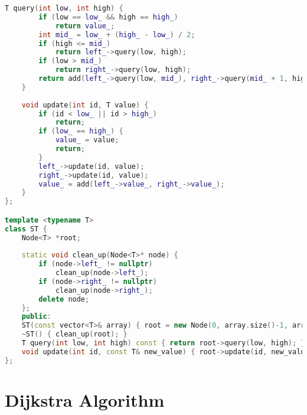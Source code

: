 \begin{itemize}
\begin{lstlisting}[language=C++]
	T query(int low, int high) {
		if (low == low_ && high == high_)
			return value_;
		int mid_ = low_ + (high_ - low_) / 2;
		if (high <= mid_)
			return left_->query(low, high);
		if (low > mid_)
			return right_->query(low, high);    
		return add(left_->query(low, mid_), right_->query(mid_ + 1, high));
	}
	
	void update(int id, T value) {
		if (id < low_ || id > high_)
			return;
		if (low_ == high_) {
			value_ = value;
			return;
		}
		left_->update(id, value);
		right_->update(id, value);
		value_ = add(left_->value_, right_->value_);
	}
};

template <typename T>
class ST {
	Node<T> *root;
	
	static void clean_up(Node<T>* node) {
		if (node->left_ != nullptr)
			clean_up(node->left_);
		if (node->right_ != nullptr)
			clean_up(node->right_);
		delete node;
	};
	public:
	ST(const vector<T>& array) { root = new Node(0, array.size()-1, array); }
	~ST() { clean_up(root); }
	T query(int low, int high) const { return root->query(low, high); }
	void update(int id, const T& new_value) { root->update(id, new_value); }
};
\end{lstlisting}
\end{itemize}

\section{Dijkstra Algorithm}